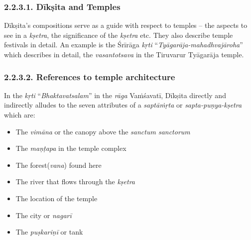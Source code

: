\vspace{-.3cm}

\subsubsection*{2.2.3.1. Dīkṣita and Temples}

\vspace{-.2cm}

Dīkṣita’s compositions serve as a guide with respect to temples – the aspects to see in a \textit{kṣetra}, the significance of the \textit{kṣetra} etc. They also describe temple festivals in detail. An example is the Śrīrāga\textit{ kṛti} “\textit{Tyāgarāja-mahadhvajāroha}” which describes in detail, the \textit{vasantotsava} in the Tiruvarur Tyāgarāja temple.

\vspace{-.3cm}

\subsubsection*{2.2.3.2. References to temple architecture}

\vspace{-.2cm}

In the \textit{kṛti} “\textit{Bhaktavatsalam}” in the \textit{rāga} Vaṁśavatī, Dīkṣita directly and indirectly alludes to the seven attributes of a \textit{saptāṁṛta} or \textit{sapta-puṇya-kṣetra} which are:

\begin{itemize}
\itemsep=0pt

 \item The \textit{vimāna} or the canopy above the \textit{sanctum sanctorum}

 \item The \textit{maṇṭapa} in the temple complex

 \item The forest(\textit{vana}) found here

 \item The river that flows through the \textit{kṣetra}

 \item The location of the temple

 \item The city or \textit{nagarī}

 \item The \textit{puṣkariṇī} or tank

\end{itemize}

